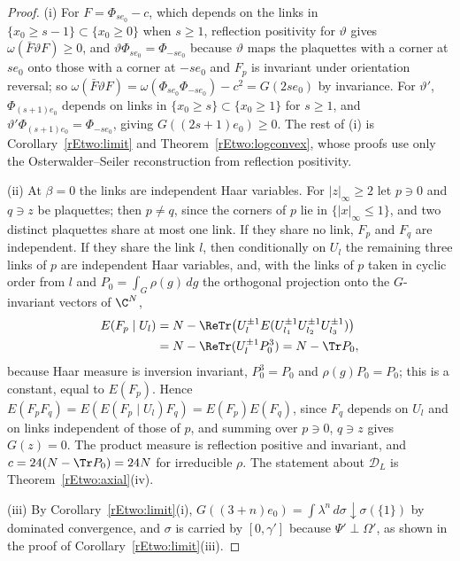 \begin{proof}
(i) For $F=\Phi_{se_0}-c$, which depends on the links in $\{x_0\ge s-1\}
\subset\{x_0\ge0\}$ when $s\ge1$, reflection positivity for $\vartheta$
gives $\omega(\bar F\vartheta F)\ge0$, and $\vartheta\Phi_{se_0}=
\Phi_{-se_0}$ because $\vartheta$ maps the plaquettes with a corner at
$se_0$ onto those with a corner at $-se_0$ and $F_p$ is invariant under
orientation reversal; so $\omega(\bar F\vartheta F)=\omega(\Phi_{se_0}
\Phi_{-se_0})-c^2=G(2se_0)$ by invariance. For $\vartheta'$, $\Phi_{(s+1)
e_0}$ depends on links in $\{x_0\ge s\}\subset\{x_0\ge1\}$ for $s\ge1$,
and $\vartheta'\Phi_{(s+1)e_0}=\Phi_{-se_0}$, giving $G((2s+1)e_0)\ge0$.
The rest of (i) is Corollary~\ref{rEtwo:limit} and
Theorem~\ref{rEtwo:logconvex}, whose proofs use only the Osterwalder--Seiler
reconstruction from reflection positivity.

(ii) At $\beta=0$ the links are independent Haar variables. For
$|z|_\infty\ge2$ let $p\ni0$ and $q\ni z$ be plaquettes; then $p\ne q$,
since the corners of $p$ lie in $\{|x|_\infty\le1\}$, and two distinct
plaquettes share at most one link. If they share no link, $F_p$ and $F_q$
are independent. If they share the link $l$, then conditionally on $U_l$
the remaining three links of $p$ are independent Haar variables, and, with
the links of $p$ taken in cyclic order from $l$ and $P_0=\int_G\rho(g)\,dg$
the orthogonal projection onto the $G$-invariant vectors of $\C^N$,
\begin{align*}
E(F_p\mid U_l)&=N-\ReTr\bigl(U_l^{\pm1}E(U_{l_1}^{\pm1}U_{l_2}^{\pm1}U_{l_3}
^{\pm1})\bigr)\\
&=N-\ReTr(U_l^{\pm1}P_0^3)=N-\Tr P_0 ,
\end{align*}
because Haar measure is inversion invariant, $P_0^3=P_0$ and $\rho(g)P_0=
P_0$; this is a constant, equal to $E(F_p)$. Hence $E(F_pF_q)=E(E(F_p\mid
U_l)F_q)=E(F_p)E(F_q)$, since $F_q$ depends on $U_l$ and on links
independent of those of $p$, and summing over $p\ni0$, $q\ni z$ gives
$G(z)=0$. The product measure is reflection positive and invariant, and
$c=24(N-\Tr P_0)=24N$ for irreducible $\rho$. The statement about
$\mathcal D_L$ is Theorem~\ref{rEtwo:axial}(iv).

(iii) By Corollary~\ref{rEtwo:limit}(i), $G((3+n)e_0)=\int\lambda^n\,
d\sigma\downarrow\sigma(\{1\})$ by dominated convergence, and $\sigma$ is
carried by $[0,\gamma']$ because $\Psi'\perp\Omega'$, as shown in the proof
of Corollary~\ref{rEtwo:limit}(iii).
\end{proof}

